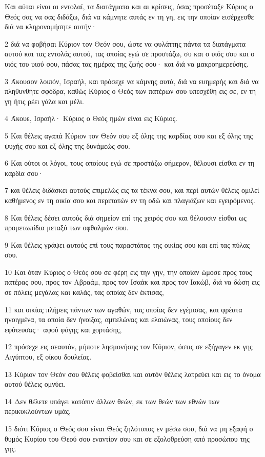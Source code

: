 \par Και αύται είναι αι εντολαί, τα διατάγματα και αι κρίσεις, όσας προσέταξε Κύριος ο Θεός σας να σας διδάξω, διά να κάμνητε αυτάς εν τη γη, εις την οποίαν εισέρχεσθε διά να κληρονομήσητε αυτήν·
\par 2 διά να φοβήσαι Κύριον τον Θεόν σου, ώστε να φυλάττης πάντα τα διατάγματα αυτού και τας εντολάς αυτού, τας οποίας εγώ σε προστάζω, συ και ο υιός σου και ο υιός του υιού σου, πάσας τας ημέρας της ζωής σου· και διά να μακροημερεύσης.
\par 3 Άκουσον λοιπόν, Ισραήλ, και πρόσεχε να κάμνης αυτά, διά να ευημερής και διά να πληθυνθήτε σφόδρα, καθώς Κύριος ο Θεός των πατέρων σου υπεσχέθη εις σε, εν τη γη ήτις ρέει γάλα και μέλι.
\par 4 Άκουε, Ισραήλ· Κύριος ο Θεός ημών είναι εις Κύριος.
\par 5 Και θέλεις αγαπά Κύριον τον Θεόν σου εξ όλης της καρδίας σου και εξ όλης της ψυχής σου και εξ όλης της δυνάμεώς σου.
\par 6 Και ούτοι οι λόγοι, τους οποίους εγώ σε προστάζω σήμερον, θέλουσι είσθαι εν τη καρδία σου·
\par 7 και θέλεις διδάσκει αυτούς επιμελώς εις τα τέκνα σου, και περί αυτών θέλεις ομιλεί καθήμενος εν τη οικία σου και περιπατών εν τη οδώ και πλαγιάζων και εγειρόμενος.
\par 8 Και θέλεις δέσει αυτούς διά σημείον επί της χειρός σου και θέλουσιν είσθαι ως προμετωπίδια μεταξύ των οφθαλμών σου.
\par 9 Και θέλεις γράψει αυτούς επί τους παραστάτας της οικίας σου και επί τας πύλας σου.
\par 10 Και όταν Κύριος ο Θεός σου σε φέρη εις την γην, την οποίαν ώμοσε προς τους πατέρας σου, προς τον Αβραάμ, προς τον Ισαάκ και προς τον Ιακώβ, διά να δώση εις σε πόλεις μεγάλας και καλάς, τας οποίας δεν έκτισας,
\par 11 και οικίας πλήρεις πάντων των αγαθών, τας οποίας δεν εγέμισας, και φρέατα ηνοιγμένα, τα οποία δεν ήνοιξας, αμπελώνας και ελαιώνας, τους οποίους δεν εφύτευσας· αφού φάγης και χορτάσης,
\par 12 πρόσεχε εις σεαυτόν, μήποτε λησμονήσης τον Κύριον, όστις σε εξήγαγεν εκ γης Αιγύπτου, εξ οίκου δουλείας.
\par 13 Κύριον τον Θεόν σου θέλεις φοβείσθαι και αυτόν θέλεις λατρεύει και εις το όνομα αυτού θέλεις ομνύει.
\par 14 Δεν θέλετε υπάγει κατόπιν άλλων θεών, εκ των θεών των εθνών των περικυκλούντων υμάς,
\par 15 διότι Κύριος ο Θεός σου είναι Θεός ζηλότυπος εν μέσω σου, διά να μη εξαφή ο θυμός Κυρίου του Θεού σου εναντίον σου και σε εξολοθρεύση από προσώπου της γης.

